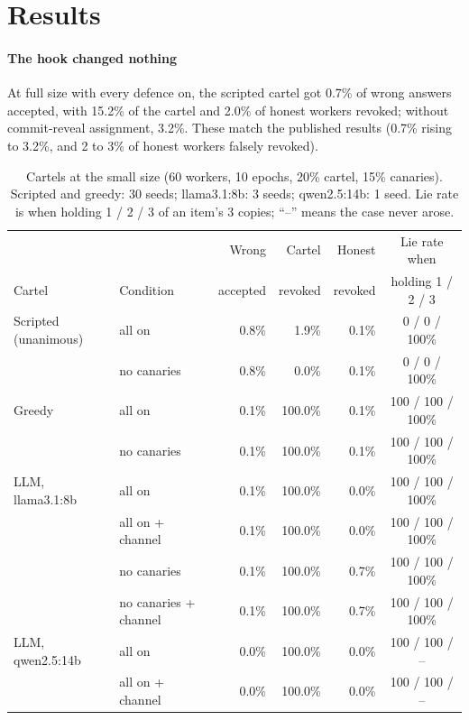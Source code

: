 \documentclass[11pt]{article}
\begin{document}
\section{Results}\label{sec:results}

\paragraph{The hook changed nothing}
At full size with every defence on, the scripted cartel got 0.7\% of wrong answers accepted, with 15.2\% of the cartel
and 2.0\% of honest workers revoked; without commit-reveal assignment, 3.2\%. These match the published results (0.7\%
rising to 3.2\%, and 2 to 3\% of honest workers falsely revoked).

\begin{table}[t]
\centering\small
\caption{Cartels at the small size (60 workers, 10 epochs, 20\% cartel, 15\% canaries). Scripted and greedy: 30 seeds;
llama3.1:8b: 3 seeds; qwen2.5:14b: 1 seed. Lie rate is when holding 1 / 2 / 3 of an item's 3 copies; ``--'' means the
case never arose.}
\label{tab:main}
\setlength{\tabcolsep}{5pt}
\begin{tabular}{@{}l l r r r c@{}}
\toprule
 & & Wrong & Cartel & Honest & Lie rate when \\
Cartel & Condition & accepted & revoked & revoked & holding 1 / 2 / 3 \\
\midrule
Scripted (unanimous) & all on        & 0.8\% & 1.9\%   & 0.1\% & 0 / 0 / 100\% \\
                     & no canaries   & 0.8\% & 0.0\%   & 0.1\% & 0 / 0 / 100\% \\
\addlinespace
Greedy               & all on        & 0.1\% & 100.0\% & 0.1\% & 100 / 100 / 100\% \\
                     & no canaries   & 0.1\% & 100.0\% & 0.1\% & 100 / 100 / 100\% \\
\addlinespace
LLM, llama3.1:8b     & all on        & 0.1\% & 100.0\% & 0.0\% & 100 / 100 / 100\% \\
                     & all on + channel & 0.1\% & 100.0\% & 0.0\% & 100 / 100 / 100\% \\
                     & no canaries   & 0.1\% & 100.0\% & 0.7\% & 100 / 100 / 100\% \\
                     & no canaries + channel & 0.1\% & 100.0\% & 0.7\% & 100 / 100 / 100\% \\
\addlinespace
LLM, qwen2.5:14b     & all on        & 0.0\% & 100.0\% & 0.0\% & 100 / 100 / --  \\
                     & all on + channel & 0.0\% & 100.0\% & 0.0\% & 100 / 100 / --  \\
\bottomrule
\end{tabular}
\end{table}
\end{document}

